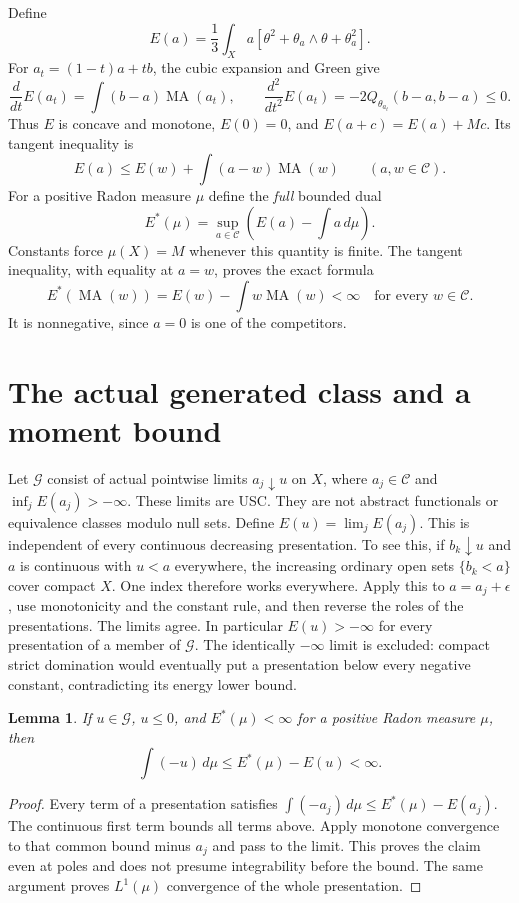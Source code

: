 \documentclass[11pt]{article}
\newcommand{\MA}{\operatorname{MA}}
\newcommand{\C}{\mathcal C}
\newcommand{\G}{\mathcal G}
\newtheorem{lemma}[theorem]{Lemma}
\theoremstyle{remark}\newtheorem{remark}[theorem]{Remark}
\begin{document}
Define
\[
 E(a)=\frac13\int_X a[\theta^2+\theta_a\wedge\theta+\theta_a^2].
\]
For $a_t=(1-t)a+tb$, the cubic expansion and Green give
\[
 \frac{d}{dt}E(a_t)=\int(b-a)\MA(a_t),\qquad
 \frac{d^2}{dt^2}E(a_t)=-2Q_{\theta_{a_t}}(b-a,b-a)\le0.
\]
Thus $E$ is concave and monotone, $E(0)=0$, and
$E(a+c)=E(a)+Mc$. Its tangent inequality is
\[
 E(a)\le E(w)+\int(a-w)\MA(w)\qquad(a,w\in\C).
\]
For a positive Radon measure $\mu$ define the \emph{full} bounded dual
\[
 E^*(\mu)=\sup_{a\in\C}\left(E(a)-\int a\,d\mu\right).
\]
Constants force $\mu(X)=M$ whenever this quantity is finite.
The tangent inequality, with equality at $a=w$, proves the exact
formula
\begin{equation}\label{dual}
 E^*(\MA(w))=E(w)-\int w\MA(w)<\infty
 \quad\text{for every }w\in\C.
\end{equation}
It is nonnegative, since $a=0$ is one of the competitors.

\section{The actual generated class and a moment bound}
Let $\G$ consist of actual pointwise limits
$a_j\downarrow u$ on $X$, where $a_j\in\C$ and
$\inf_jE(a_j)>-\infty$. These limits are USC.
They are not abstract functionals or equivalence classes modulo
null sets. Define $E(u)=\lim_jE(a_j)$.
This is independent of every continuous decreasing presentation.
To see this, if $b_k\downarrow u$ and $a$ is continuous with $u<a$
everywhere, the increasing ordinary open sets $\{b_k<a\}$ cover
compact $X$. One index therefore works everywhere. Apply this to
$a=a_j+\epsilon$, use monotonicity and the constant rule, and
then reverse the roles of the presentations. The limits agree.
In particular $E(u)>-\infty$ for every presentation of a member
of $\G$. The identically $-\infty$ limit is excluded: compact
strict domination would eventually put a presentation below every
negative constant, contradicting its energy lower bound.

\begin{lemma}\label{moment}
If $u\in\G$, $u\le0$, and $E^*(\mu)<\infty$ for a positive
Radon measure $\mu$, then
\[
 \int(-u)\,d\mu\le E^*(\mu)-E(u)<\infty.
\]
\end{lemma}
\begin{proof}
Every term of a presentation satisfies
$\int(-a_j)\,d\mu\le E^*(\mu)-E(a_j)$.
The continuous first term bounds all terms above. Apply monotone
convergence to that common bound minus $a_j$ and pass to the limit.
This proves the claim even at poles and does not presume
integrability before the bound. The same argument proves
$L^1(\mu)$ convergence of the whole presentation.
\end{proof}
\end{document}
